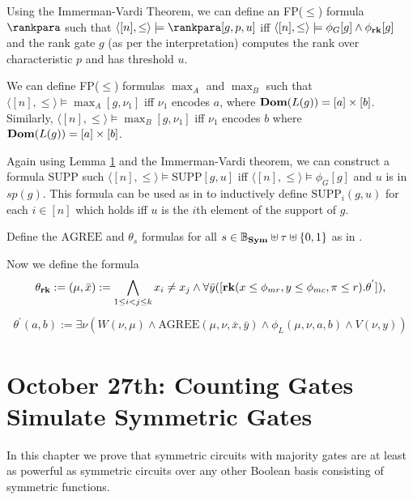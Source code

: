 \documentclass[12pt]{report}
\newcommand{\SB}{\mathbb{B}_{\sym}} %
\newcommand{\sym}{\text{\textbf{Sym}}}
\newcommand{\rank}{\text{\textbf{rk}}}
\newcommand{\dom}{\text{\textbf{Dom}}}
\newcommand{\agree}{\text{AGREE}}
\newcommand{\supp}{\text{SUPP}}
\begin{document}
Using the Immerman-Vardi Theorem, we can define an FP($\leq$) formula
$\rankpara$ such that $\langle [n], \leq\rangle \models \rankpara[g,p,u]$ iff
$\langle [n], \leq\rangle \models \phi_G[g] \land \phi_{\rank}[g]$ and the rank
gate $g$ (as per the interpretation) computes the rank over characteristic $p$
and has threshold $u$.

We can define FP($\leq$) formulas $\max_A$ and $\max_B$ such that $\langle [n],
\leq \rangle \models \max_A[g, \nu_1]$ iff $\nu_1$ encodes $a$, where
$\dom(L(g)) = [a]\times [b]$. Similarly, $\langle [n], \leq \rangle \models
\max_B[g, \nu_1]$ iff $\nu_1$ encodes $b$ where $\dom(L(g)) = [a] \times [b]$.

Again using Lemma \ref{} and the Immerman-Vardi theorem, we can construct a
formula $\supp$ such $\langle [n], \leq \rangle \models \supp[g,u]$ iff $\langle
[n], \leq \rangle \models \phi_G[g]$ and $u$ is in $sp(g)$. This formula can be
used as in \cite{} to inductively define $\supp_i(g,u)$ for each $i \in [n]$
which holds iff $u$ is the $i$th element of the support of $g$.

Define the $\agree$ and $\theta_s$ formulas for all $s \in \SB \uplus \tau
\uplus \{0,1\}$ as in \cite{}.

Now we define the formula
\begin{align*}
  \theta_{\rank}:= (\mu, \bar{x}) := \bigwedge_{1 \leq i < j \leq k} x_i
  \neq x_j \wedge \forall \bar{y} ( [ \rank (x \leq \phi_{mr}, y \leq
  \phi_{mc}, \pi \leq r). \theta^{'} ] ),
\end{align*}
\begin{align*}
  \theta^{'}(a,b):= \exists \nu (W(\nu, \mu) \wedge \agree (\mu,\nu, \bar{x}, \bar{y}) \wedge \phi_L (\mu, \nu, a, b) \wedge V(\nu, y))
\end{align*}



\chapter{October 27th: Counting Gates Simulate Symmetric Gates}

In this chapter we prove that symmetric circuits with majority gates are at
least as powerful as symmetric circuits over any other Boolean basis consisting
of symmetric functions.
\end{document}
